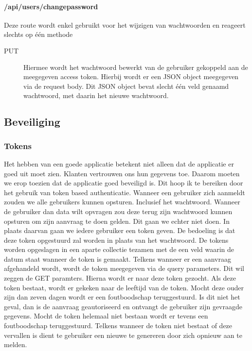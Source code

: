 \documentclass[a4paper,11pt]{article}
\begin{document}
\paragraph{/api/users/changepassword}
Deze route wordt enkel gebruikt voor het wijzigen van wachtwoorden en reageert slechts op één methode
\begin{description}
\item[PUT] Hiermee wordt het wachtwoord bewerkt van de gebruiker gekoppeld aan de meegegeven access token. Hierbij wordt er een JSON object meegegeven via de request body. Dit JSON object bevat slecht één veld genaamd wachtwoord, met daarin het nieuwe wachtwoord.
\end{description}

\subsection{Beveiliging}
\subsubsection{Tokens}
Het hebben van een goede applicatie betekent niet alleen dat de applicatie er goed uit moet zien. Klanten vertrouwen ons hun gegevens toe. Daarom moeten we erop toezien dat de applicatie goed beveiligd is. Dit hoop ik te bereiken door het gebruik van token based authenticatie. Wanneer een gebruiker zich aanmeldt zouden we alle gebruikers kunnen opsturen. Inclusief het wachtwoord. Wanneer de gebruiker dan data wilt opvragen zou deze terug zijn wachtwoord kunnen opsturen om zijn aanvraag te doen gelden. Dit gaan we echter niet doen. In plaats daarvan gaan we iedere gebruiker een token geven. De bedoeling is dat deze token opgestuurd zal worden in plaats van het wachtwoord. De tokens worden opgeslagen in een aparte collectie tezamen met de een veld waarin de datum staat wanneer de token is gemaakt. Telkens wanneer er een aanvraag afgehandeld wordt, wordt de token meegegeven via de query parameters. Dit wil zeggen de GET paramters. Hierna wordt er naar deze token gezocht. Als deze token bestaat, wordt er gekeken naar de leeftijd van de token. Mocht deze ouder zijn dan zeven dagen wordt er een foutboodschap teruggestuurd. Is dit niet het geval, dan is de aanvraag geautoriseerd en ontvangt de gebruiker zijn gevraagde gegevens. Mocht de token helemaal niet bestaan wordt er tevens een foutboodschap teruggestuurd. Telkens wanneer de token niet bestaat of deze vervallen is dient te gebruiker een nieuwe te genereren door zich opnieuw aan te melden.
\end{document}
